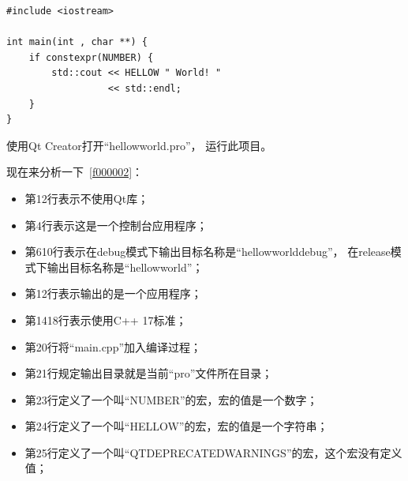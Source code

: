 \FloatBarrier
\begin{lstlisting}[label=f000003,
caption=GoodLuck,
title=\lstlistingname\ \thelstlisting
]
#include <iostream>

int main(int , char **) {
    if constexpr(NUMBER) {
        std::cout << HELLOW " World! "
                  << std::endl;
    }
}
\end{lstlisting}          %


使用Qt Creator打开“hellow\underline{\hspace{0.5em}}world.pro”，
运行此项目。

现在来分析一下\lstlistingname\ \ref{f000002}：
\begin{itemize}
\item 第1\raisebox{0.16ex}{\sourcefonttwo\~{}}2行表示不使用Qt库；
\item 第4行表示这是一个控制台应用程序；
\item 第6\raisebox{0.16ex}{\sourcefonttwo\~{}}10行表示在debug模式下输出目标名称是“hellow\underline{\hspace{0.5em}}world\underline{\hspace{0.5em}}debug”，
在release模式下输出目标名称是“hellow\underline{\hspace{0.5em}}world”；
\item 第12行表示输出的是一个应用程序；
\item 第14\raisebox{0.16ex}{\sourcefonttwo\~{}}18行表示使用C{\sourcefonttwo{}+}{\sourcefonttwo{}+} 17标准；
\item 第20行将“main.cpp”加入编译过程；
\item 第21行规定输出目录就是当前“pro”文件所在目录；
\item 第23行定义了一个叫“NUMBER”的宏，宏的值是一个数字；
\item 第24行定义了一个叫“HELLOW”的宏，宏的值是一个字符串；
\item 第25行定义了一个叫“QT\underline{\hspace{0.5em}}DEPRECATED\underline{\hspace{0.5em}}WARNINGS”的宏，这个宏没有定义值；
\end{itemize}

